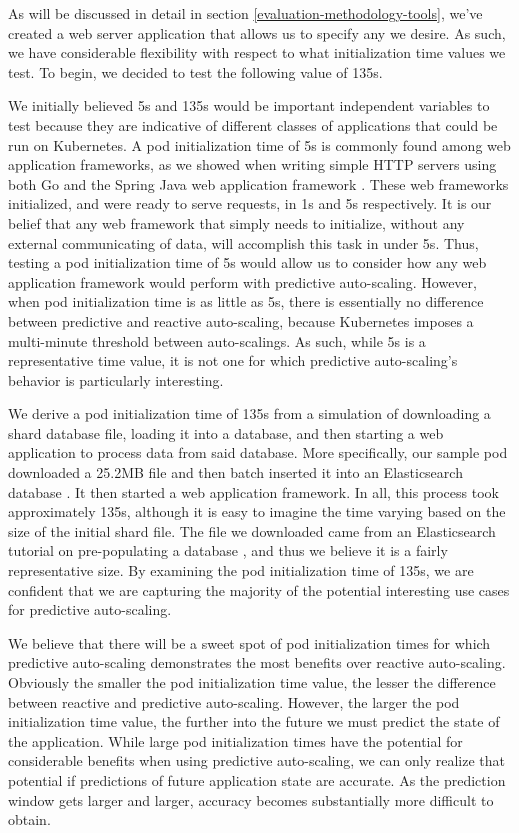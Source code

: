 As will be discussed in detail in section \ref{evaluation-methodology-tools},
we've created a web server application that allows us to specify any
 we desire. As such, we have considerable flexibility with
respect to what initialization time values we test. To begin, we decided to test the
following value of 135s.

We initially believed 5s and 135s would be important independent variables to test because they
are indicative of different classes of applications that could be run on
Kubernetes. A pod initialization time of 5s is commonly found among web
application frameworks, as we showed when writing simple HTTP servers using
both Go and the Spring Java web application framework \cite{spring}. These web
frameworks initialized, and were ready to serve requests, in 1s and 5s
respectively. It is our belief that any web framework that simply
needs to initialize, without any external communicating of data, will
accomplish this task in under 5s. Thus, testing a pod initialization time of 5s
would allow us to consider how any web application framework would perform with
predictive auto-scaling. However, when pod initialization time is as little as
5s, there is essentially no difference between predictive and reactive
auto-scaling, because Kubernetes imposes a multi-minute threshold between auto-scalings.
As such, while 5s is a representative time value, it is not
one for which predictive auto-scaling's behavior is particularly interesting.

We derive a pod initialization time of 135s from a simulation of downloading a
shard database file, loading it into a database, and then starting a web
application to process data from said database. More specifically, our sample
pod downloaded a 25.2MB file and then batch inserted it into an Elasticsearch
database \cite{elasticsearch}. It then started a web application framework. In
all, this process took approximately 135s, although it is easy to imagine the
time varying based on the size of the initial shard file. The file we downloaded
came from an Elasticsearch tutorial on pre-populating a database
\cite{elasticsearch-import-some-data}, and thus we believe it is a fairly
representative size. By examining the pod initialization time of 135s, we
are confident that we are capturing the majority of the potential interesting use cases for
predictive auto-scaling.

We believe that there will be a sweet spot of pod initialization times
for which predictive auto-scaling demonstrates the most benefits over reactive
auto-scaling. Obviously the smaller the pod initialization time value, the lesser
the difference between reactive and predictive auto-scaling.
However, the larger the pod initialization time value, the further into
the future we must predict the state of the application. While large pod
initialization times have the potential for considerable benefits when using
predictive auto-scaling, we can only realize that potential if predictions of
future application state are accurate. As the prediction window gets larger and
larger, accuracy becomes substantially more difficult to obtain.
